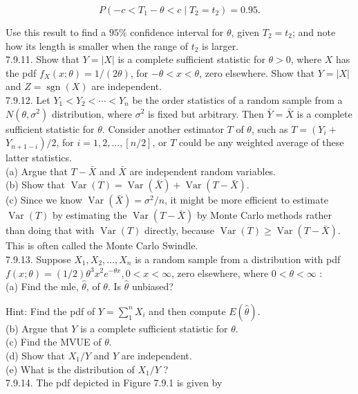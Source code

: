 $$
P\left(-c<T_{1}-\theta<c \mid T_{2}=t_{2}\right)=0.95 .
$$

Use this result to find a $95 \%$ confidence interval for $\theta$, given $T_{2}=t_{2}$; and note how its length is smaller when the range of $t_{2}$ is larger.\\
7.9.11. Show that $Y=|X|$ is a complete sufficient statistic for $\theta>0$, where $X$ has the pdf $f_{X}(x ; \theta)=1 /(2 \theta)$, for $-\theta<x<\theta$, zero elsewhere. Show that $Y=|X|$ and $Z=\operatorname{sgn}(X)$ are independent.\\
7.9.12. Let $Y_{1}<Y_{2}<\cdots<Y_{n}$ be the order statistics of a random sample from a $N\left(\theta, \sigma^{2}\right)$ distribution, where $\sigma^{2}$ is fixed but arbitrary. Then $\bar{Y}=\bar{X}$ is a complete sufficient statistic for $\theta$. Consider another estimator $T$ of $\theta$, such as $T=\left(Y_{i}+\right.$ $\left.Y_{n+1-i}\right) / 2$, for $i=1,2, \ldots,[n / 2]$, or $T$ could be any weighted average of these latter statistics.\\
(a) Argue that $T-\bar{X}$ and $\bar{X}$ are independent random variables.\\
(b) Show that $\operatorname{Var}(T)=\operatorname{Var}(\bar{X})+\operatorname{Var}(T-\bar{X})$.\\
(c) Since we know $\operatorname{Var}(\bar{X})=\sigma^{2} / n$, it might be more efficient to estimate $\operatorname{Var}(T)$ by estimating the $\operatorname{Var}(T-\bar{X})$ by Monte Carlo methods rather than doing that with $\operatorname{Var}(T)$ directly, because $\operatorname{Var}(T) \geq \operatorname{Var}(T-\bar{X})$. This is often called the Monte Carlo Swindle.\\
7.9.13. Suppose $X_{1}, X_{2}, \ldots, X_{n}$ is a random sample from a distribution with pdf $f(x ; \theta)=(1 / 2) \theta^{3} x^{2} e^{-\theta x}, 0<x<\infty$, zero elsewhere, where $0<\theta<\infty$ :\\
(a) Find the mle, $\hat{\theta}$, of $\theta$. Is $\hat{\theta}$ unbiased?

Hint: Find the pdf of $Y=\sum_{1}^{n} X_{i}$ and then compute $E(\hat{\theta})$.\\
(b) Argue that $Y$ is a complete sufficient statistic for $\theta$.\\
(c) Find the MVUE of $\theta$.\\
(d) Show that $X_{1} / Y$ and $Y$ are independent.\\
(e) What is the distribution of $X_{1} / Y$ ?\\
7.9.14. The pdf depicted in Figure 7.9.1 is given by


